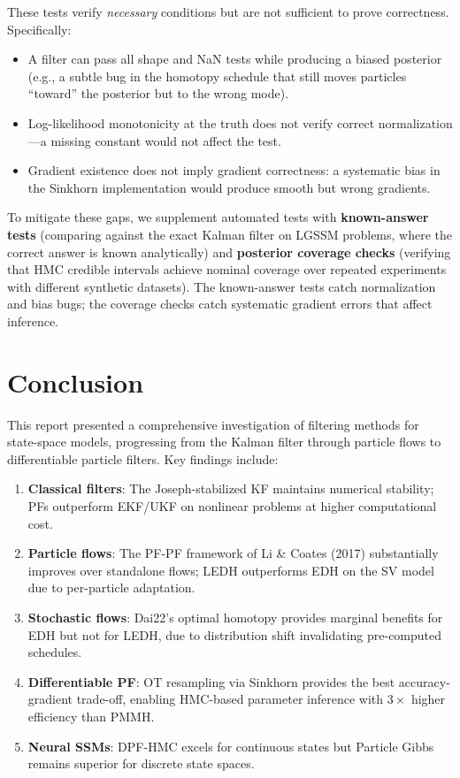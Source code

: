 \documentclass[12pt,a4paper]{article}
\theoremstyle{definition}
\theoremstyle{remark}
\begin{document}
These tests verify \emph{necessary} conditions but are not sufficient to prove correctness. Specifically:
\begin{itemize}[leftmargin=*]
	\item A filter can pass all shape and NaN tests while producing a biased posterior (e.g., a subtle bug in the homotopy schedule that still moves particles ``toward'' the posterior but to the wrong mode).
	\item Log-likelihood monotonicity at the truth does not verify correct normalization---a missing constant would not affect the test.
	\item Gradient existence does not imply gradient correctness: a systematic bias in the Sinkhorn implementation would produce smooth but wrong gradients.
\end{itemize}

To mitigate these gaps, we supplement automated tests with \textbf{known-answer tests} (comparing against the exact Kalman filter on LGSSM problems, where the correct answer is known analytically) and \textbf{posterior coverage checks} (verifying that HMC credible intervals achieve nominal coverage over repeated experiments with different synthetic datasets). The known-answer tests catch normalization and bias bugs; the coverage checks catch systematic gradient errors that affect inference.


\section{Conclusion}
\label{sec:conclusion}

This report presented a comprehensive investigation of filtering methods for state-space models, progressing from the Kalman filter through particle flows to differentiable particle filters. Key findings include:

\begin{enumerate}
	\item \textbf{Classical filters}: The Joseph-stabilized KF maintains numerical stability; PFs outperform EKF/UKF on nonlinear problems at higher computational cost.
	\item \textbf{Particle flows}: The PF-PF framework of Li \& Coates (2017) substantially improves over standalone flows; LEDH outperforms EDH on the SV model due to per-particle adaptation.
	\item \textbf{Stochastic flows}: Dai22's optimal homotopy provides marginal benefits for EDH but not for LEDH, due to distribution shift invalidating pre-computed schedules.
	\item \textbf{Differentiable PF}: OT resampling via Sinkhorn provides the best accuracy-gradient trade-off, enabling HMC-based parameter inference with $3\times$ higher efficiency than PMMH.
	\item \textbf{Neural SSMs}: DPF-HMC excels for continuous states but Particle Gibbs remains superior for discrete state spaces.
\end{enumerate}
\end{document}

